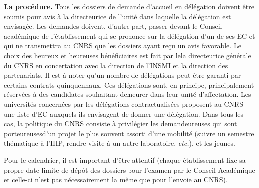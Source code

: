 \textbf{La proc\'edure.} Tous les dossiers de demande d'accueil en
d\'el\'egation doivent \^etre soumis pour avis \`a la directeur\mp ice de
l'unit\'e dans laquelle la d\'el\'egation est envisag\'ee. Les
demandes doivent, d'autre part, passer devant le Conseil
acad\'emique de l'\'etablissement qui se prononce sur la d\'el\'egation d'un de ses EC
et qui ne transmettra au CNRS que les dossiers ayant re\c cu un
avis favorable. Le choix des heureux et heureuses b\'en\'eficiaires est fait par
le\mp la directeur\mp ice g\'en\'eral\mp e du CNRS en concertation avec la direction
de l'INSMI et la direction des partenariats. Il est \`a noter
qu'un nombre de d\'el\'egations peut \^etre garanti par certains
contrats quinquennaux. Ces d\'el\'egations sont, en principe,
principalement r\'eserv\'ees \`a des candidat\mp e\mp s souhaitant demeurer
dans leur unit\'e d'affectation. Les universit\'es concern\'ees par
les d\'el\'egations \og contractualis\'ees\fg{} proposent au CNRS
une liste d'EC auxquels ils envisagent de donner
une d\'el\'egation. Dans tous les cas, la politique du CNRS consiste
\`a privil\'egier les demandeur\mp euse\mp s qui sont porteur\mp euse\mp sd'un projet le plus souvent
assorti d'une mobilit\'e (suivre un semestre th\'ematique \`a l'IHP,
rendre visite \`a un autre laboratoire, {\em etc.}), et les jeunes. 

Pour le calendrier, il est important d'être attentif (chaque \'etablissement fixe sa propre
date limite de d\'ep\^ot des dossiers pour l'examen par le Conseil
Acad\'emique et celle-ci n'est pas n\'ecessairement la même que pour l'envoie au CNRS). 


